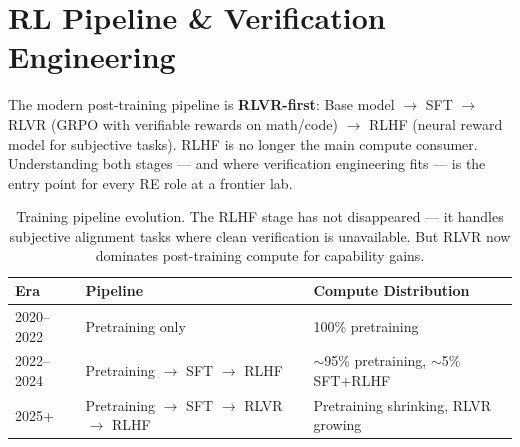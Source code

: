\newpage
\section{RL Pipeline \& Verification Engineering}

\smallskip

The modern post-training pipeline is \textbf{RLVR-first}: Base model $\to$ SFT $\to$ RLVR (GRPO with verifiable rewards on math/code) $\to$ RLHF (neural reward model for subjective tasks). RLHF is no longer the main compute consumer. Understanding both stages --- and where verification engineering fits --- is the entry point for every RE role at a frontier lab.

\begin{table}[h]
\centering
\begin{tabular}{@{}lll@{}}
\toprule
\textbf{Era} & \textbf{Pipeline} & \textbf{Compute Distribution} \\
\midrule
2020--2022 & Pretraining only & 100\% pretraining \\
2022--2024 & Pretraining $\to$ SFT $\to$ RLHF & $\sim$95\% pretraining, $\sim$5\% SFT+RLHF \\
2025+ & Pretraining $\to$ SFT $\to$ RLVR $\to$ RLHF & Pretraining shrinking, RLVR growing \\
\bottomrule
\end{tabular}
\caption{Training pipeline evolution. The RLHF stage has not disappeared --- it handles subjective alignment tasks where clean verification is unavailable. But RLVR now dominates post-training compute for capability gains.}
\end{table}

